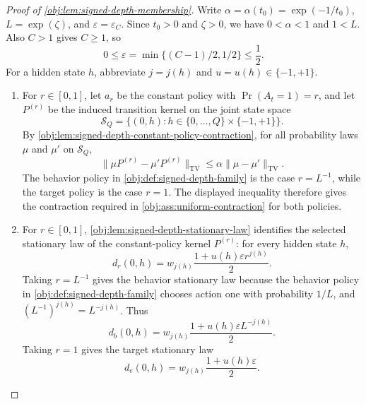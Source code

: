 \begin{proof}[Proof of \cref{obj:lem:signed-depth-membership}]
Write \(\alpha=\alpha(t_0)=\exp(-1/t_0)\), \(L=\exp(\zeta)\), and
\(\varepsilon=\varepsilon_C\).  Since \(t_0>0\) and \(\zeta>0\), we have
\(0<\alpha<1\) and \(1<L\).  Also \(C>1\) gives \(C\ge 1\), so
\[
0\le \varepsilon=\min\{(C-1)/2,1/2\}\le \frac12 .
\]
For a hidden state \(h\), abbreviate \(j=j(h)\) and \(u=u(h)\in\{-1,+1\}\).

\begin{enumerate}
\item For \(r\in[0,1]\), let \(a_r\) be the constant policy with
\(\Pr(A_t=1)=r\), and let \(P^{(r)}\) be the induced transition kernel on the
joint state space
\[
\mathcal S_Q=\{(0,h):h\in\{0,\ldots,Q\}\times\{-1,+1\}\}.
\]
By \cref{obj:lem:signed-depth-constant-policy-contraction}, for all probability
laws \(\mu\) and \(\mu'\) on \(\mathcal S_Q\),
\[
\|\mu P^{(r)}-\mu'P^{(r)}\|_{\mathrm{TV}}
\le
\alpha\|\mu-\mu'\|_{\mathrm{TV}}.
\]
The behavior policy in \cref{obj:def:signed-depth-family} is the case
\(r=L^{-1}\), while the target policy is the case \(r=1\).  The displayed
inequality therefore gives the contraction required in
\cref{obj:ass:uniform-contraction} for both policies. %

\item For \(r\in[0,1]\), \cref{obj:lem:signed-depth-stationary-law} identifies
the selected stationary law of the constant-policy kernel \(P^{(r)}\): for
every hidden state \(h\),
\[
d_r(0,h)
=
w_{j(h)}
\frac{1+u(h)\varepsilon r^{j(h)}}2 .
\]
Taking \(r=L^{-1}\) gives the behavior stationary law because the behavior
policy in \cref{obj:def:signed-depth-family} chooses action one with
probability \(1/L\), and \((L^{-1})^{j(h)}=L^{-j(h)}\).  Thus
\[
d_b(0,h)
=
w_{j(h)}
\frac{1+u(h)\varepsilon L^{-j(h)}}2 .
\]
Taking \(r=1\) gives the target stationary law
\[
d_e(0,h)
=
w_{j(h)}
\frac{1+u(h)\varepsilon}{2}.
\] %


\end{enumerate}
\end{proof}
